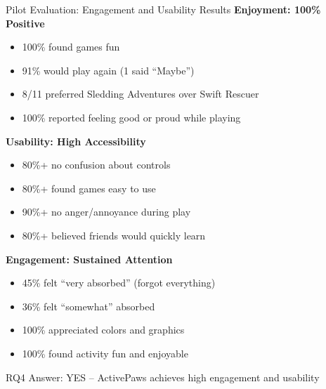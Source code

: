 \begin{frame}{Pilot Evaluation: Engagement and Usability Results}
	\textbf{\textcolor{gbAqua}{Enjoyment: 100\% Positive}}
	
	\begin{itemize}
		\item 100\% found games fun
		\item 91\% would play again (1 said ``Maybe'')
		\item 8/11 preferred Sledding Adventures over Swift Rescuer
		\item 100\% reported feeling good or proud while playing
	\end{itemize}
	
	\vspace{0.3cm}
	
	\textbf{\textcolor{gbAqua}{Usability: High Accessibility}}
	
	\begin{itemize}
		\item 80\%+ no confusion about controls
		\item 80\%+ found games easy to use
		\item 90\%+ no anger/annoyance during play
		\item 80\%+ believed friends would quickly learn
	\end{itemize}
	
	\vspace{0.3cm}
	
	\textbf{\textcolor{gbAqua}{Engagement: Sustained Attention}}
	
	\begin{itemize}
		\item 45\% felt ``very absorbed'' (forgot everything)
		\item 36\% felt ``somewhat'' absorbed
		\item 100\% appreciated colors and graphics
		\item 100\% found activity fun and enjoyable
	\end{itemize}
	
	\vspace{0.2cm}
	
	\alert{RQ4 Answer: YES – ActivePaws achieves high engagement and usability}
	
\end{frame}


